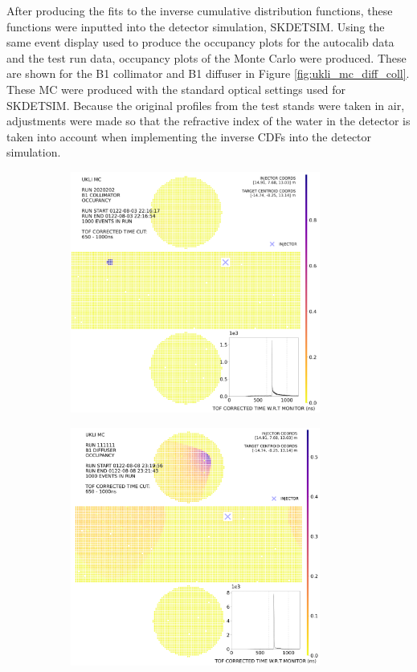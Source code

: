 After producing the fits to the inverse cumulative distribution functions, these functions were inputted into the detector simulation, SKDETSIM. Using the same event display used to produce the occupancy plots for the autocalib data and the test run data, occupancy plots of the Monte Carlo were produced. These are shown for the B1 collimator and B1 diffuser in Figure \ref{fig:ukli_mc_diff_coll}. These MC were produced with the standard optical settings used for SKDETSIM. Because the original profiles from the test stands were taken in air, adjustments were made so that the refractive index of the water in the detector is taken into account when implementing the inverse CDFs into the detector simulation. 

\begin{figure}[htp]
    \begin{subfigure}{0.49\columnwidth}
    \centering
    \includegraphics[width=0.9\textwidth]{Figures/ukli_mc_B1.PNG}
    \label{fig:ukli_mc_coll}
    \end{subfigure}\hfill
    \begin{subfigure}{0.49\columnwidth}
    \centering
    \includegraphics[width=0.9\textwidth]{Figures/ukli_diff_mc_B1.PNG}

\end{subfigure}
\end{figure}
